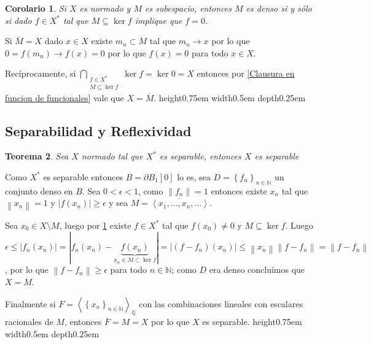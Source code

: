 \documentclass[11pt]{article}
\newcommand{\N}{{\mathbb{N}}}
\newcommand{\norm}[1]{\left\lVert#1\right\rVert}
\newcommand{\abs}[1]{\left\lvert#1\right\rvert}
\newcommand{\ip}[1]{\left\langle#1\right\rangle}
\newcommand{\sett}[1]{\left\lbrace#1\right\rbrace}
\newcommand{\Bigcap}[2]{\bigcap\limits_{#1}{#2}}
\newtheorem{theorem}{Teorema}
\numberwithin{theorem}{subsection}
\newtheorem{corollary}[theorem]{Corolario}
\newenvironment{proof}[1][Demostraci\'on]{\begin{trivlist}
		\item[\hskip \labelsep {\bfseries #1}]}{\end{trivlist}}
\newcommand{\qed}{\nobreak \ifvmode \relax \else
	\ifdim\lastskip<1.5em \hskip-\lastskip
	\hskip1.5em plus0em minus0.5em \fi \nobreak
	\vrule height0.75em width0.5em depth0.25em\fi}
\begin{document}
\begin{corollary}
	\label{M es denso si el unico funcional que lo anula es el nulo}
	Si $X$ es normado y $M$ es subespacio, entonces $M$ es denso si y s\'olo si dado $f \in X^{\ast}$ tal que $M \subseteq \ker f$ implique que $f = 0$.
\end{corollary}

\begin{proof}
	Si $\overline{M} = X$ dado $x \in X$ existe $m_n \subset M$ tal que $m_n \rightarrow x$ por lo que $0 = f(m_n)  \rightarrow f(x) = 0$ por lo que $f(x) = 0$ para todo $x \in X$.
	
	Rec\'iprocamente, si $\Bigcap{\substack{f \in X^{\ast} \\ M \subseteq \ker f}}{\ker f} = \ker 0 = X$ entonces por \ref{Clausura en funcion de funcionales} vale que $X = \overline{M}$. \qed
	
\end{proof}

\subsection{Separabilidad y Reflexividad}

\begin{theorem}
	\label{Dual separable implica separable}
	Sea $X$ normado tal que $X^{\ast}$ es separable, entonces $X$ es separable	
\end{theorem}

\begin{proof}
	Como $X^{\ast}$ es separable entonces $B = \partial B_1[0]$ lo es, sea $D = \sett{f_n}_{n \in \N}$ un conjunto denso en $B$. Sea $0 < \epsilon < 1$, como $\norm{f_n} = 1$ entonces existe $x_n$ tal que $\norm{x_n} = 1$ y $\abs{f(x_n)} \geq \epsilon$ y sea $M = \overline{\ip{x_1 , \dots , x_n, \dots }}$.
	
	Sea $x_0 \in X \setminus M$, luego por \ref{M es denso si el unico funcional que lo anula es el nulo} existe $f \in X^{\ast}$ tal que $f(x_0) \neq 0 $ y $M \subseteq \ker f$. Luego $\epsilon \leq \abs{f_n(x_n)} = \abs{f_n(x_n) - \underbrace{f(x_n)}_{x_n \in M \subset \ker f}} = \abs{(f-f_n)(x_n)} \leq \norm{x_n} \norm{f-f_n} = \norm{f-f_n}$, por lo que $\norm{f-f_n} \geq \epsilon$ para todo $n \in \N$; como $D$ era denso conclu\'imos que $X = M$.
	
	Finalmente si $F = \ip{\sett{x_n}_{n \in  \N}}_{\mathbb{Q}}$ con las combinaciones lineales con escalares racionales de $M$, entonces $\overline{F} = M = X$ por lo que $X$ es separable. \qed
	
\end{proof}
\end{document}
